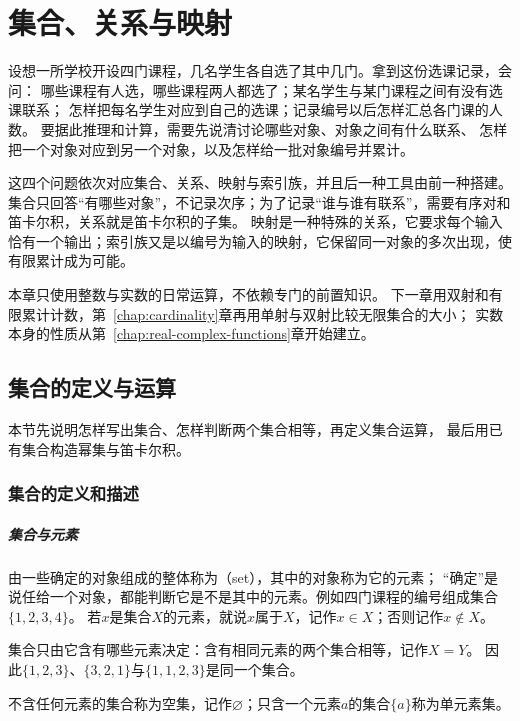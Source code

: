 \chapter{集合、关系与映射}
\label{chap:sets-functions-and-proofs}
\label{chap:sets-relations-maps}

设想一所学校开设四门课程，几名学生各自选了其中几门。拿到这份选课记录，会问：
哪些课程有人选，哪些课程两人都选了；某名学生与某门课程之间有没有选课联系；
怎样把每名学生对应到自己的选课；记录编号以后怎样汇总各门课的人数。
要据此推理和计算，需要先说清讨论哪些对象、对象之间有什么联系、
怎样把一个对象对应到另一个对象，以及怎样给一批对象编号并累计。

这四个问题依次对应集合、关系、映射与索引族，并且后一种工具由前一种搭建。
集合只回答“有哪些对象”，不记录次序；为了记录“谁与谁有联系”，需要有序对和笛卡尔积，关系就是笛卡尔积的子集。
映射是一种特殊的关系，它要求每个输入恰有一个输出；索引族又是以编号为输入的映射，它保留同一对象的多次出现，使有限累计成为可能。

本章只使用整数与实数的日常运算，不依赖专门的前置知识。
下一章用双射和有限累计计数，第~\ref{chap:cardinality}章再用单射与双射比较无限集合的大小；
实数本身的性质从第~\ref{chap:real-complex-functions}章开始建立。

\section{集合的定义与运算}
\label{sec:prelim-sets-relations-functions}

本节先说明怎样写出集合、怎样判断两个集合相等，再定义集合运算，
最后用已有集合构造幂集与笛卡尔积。

\subsection{集合的定义和描述}
\label{sec:prelim-set-definition}

\paragraph{集合与元素}
由一些确定的对象组成的整体称为（set），其中的对象称为它的元素；
“确定”是说任给一个对象，都能判断它是不是其中的元素。例如四门课程的编号组成集合$\{1,2,3,4\}$。
若$x$是集合$X$的元素，就说$x$属于$X$，记作$x\in X$；否则记作$x\notin X$。

集合只由它含有哪些元素决定：含有相同元素的两个集合相等，记作$X=Y$。
因此$\{1,2,3\}$、$\{3,2,1\}$与$\{1,1,2,3\}$是同一个集合。

不含任何元素的集合称为空集，记作$\varnothing$；只含一个元素$a$的集合$\{a\}$称为单元素集。

